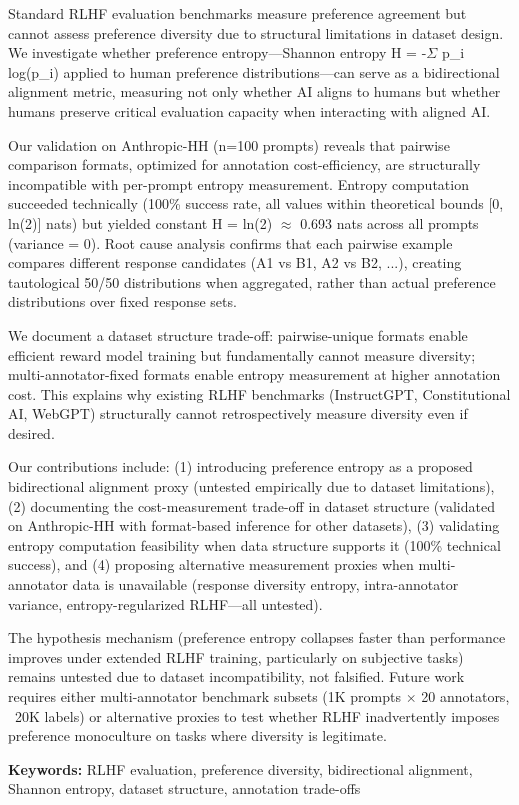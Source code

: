 
Standard RLHF evaluation benchmarks measure preference agreement but cannot assess preference diversity due to structural limitations in dataset design. We investigate whether preference entropy---Shannon entropy H = -$\Sigma$ p\_i log(p\_i) applied to human preference distributions---can serve as a bidirectional alignment metric, measuring not only whether AI aligns to humans but whether humans preserve critical evaluation capacity when interacting with aligned AI.

Our validation on Anthropic-HH (n=100 prompts) reveals that pairwise comparison formats, optimized for annotation cost-efficiency, are structurally incompatible with per-prompt entropy measurement. Entropy computation succeeded technically (100\% success rate, all values within theoretical bounds [0, ln(2)] nats) but yielded constant H = ln(2) $\approx$ 0.693 nats across all prompts (variance = 0). Root cause analysis confirms that each pairwise example compares different response candidates (A1 vs B1, A2 vs B2, ...), creating tautological 50/50 distributions when aggregated, rather than actual preference distributions over fixed response sets.

We document a dataset structure trade-off: pairwise-unique formats enable efficient reward model training but fundamentally cannot measure diversity; multi-annotator-fixed formats enable entropy measurement at higher annotation cost. This explains why existing RLHF benchmarks (InstructGPT, Constitutional AI, WebGPT) structurally cannot retrospectively measure diversity even if desired.

Our contributions include: (1) introducing preference entropy as a proposed bidirectional alignment proxy (untested empirically due to dataset limitations), (2) documenting the cost-measurement trade-off in dataset structure (validated on Anthropic-HH with format-based inference for other datasets), (3) validating entropy computation feasibility when data structure supports it (100\% technical success), and (4) proposing alternative measurement proxies when multi-annotator data is unavailable (response diversity entropy, intra-annotator variance, entropy-regularized RLHF---all untested).

The hypothesis mechanism (preference entropy collapses faster than performance improves under extended RLHF training, particularly on subjective tasks) remains untested due to dataset incompatibility, not falsified. Future work requires either multi-annotator benchmark subsets (1K prompts $\times$ 20 annotators, ~20K labels) or alternative proxies to test whether RLHF inadvertently imposes preference monoculture on tasks where diversity is legitimate.

\textbf{Keywords:} RLHF evaluation, preference diversity, bidirectional alignment, Shannon entropy, dataset structure, annotation trade-offs

